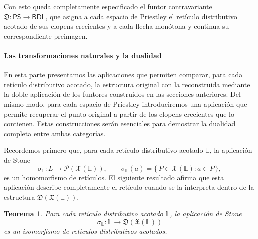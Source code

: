 \documentclass[12pt]{book}
\newtheorem{theorem}{Teorema}[section]
\newcommand{\X}{\mathfrak{X}}
\newcommand{\D}{\mathfrak{D}}
\begin{document}
\smallskip

Con esto queda completamente especificado el funtor contravariante 
\(\D\colon\mathsf{PS}\to\mathsf{BDL}\), que asigna a cada espacio de Priestley el 
retículo distributivo acotado de sus clopens crecientes y a cada flecha 
monótona y continua su correspondiente preimagen.



\paragraph{Las transformaciones naturales y la dualidad}\;

\medskip

En esta parte presentamos las aplicaciones que permiten comparar, para cada retículo distributivo acotado, la estructura original con la reconstruida mediante la doble aplicación de los funtores construidos en las secciones anteriores. Del mismo modo, para cada espacio de Priestley introduciremos una aplicación que permite recuperar el punto original a partir de los clopens crecientes que lo contienen. Estas construcciones serán esenciales para demostrar la dualidad completa entre ambas categorías.

\medskip

Recordemos primero que, para cada retículo distributivo acotado $\mathbb{L}$, la aplicación de Stone
\[
\sigma_{\mathbb{L}}\colon L\longrightarrow \mathcal{P}(\mathcal{X}(\mathbb{L})),
\qquad 
\sigma_{\mathbb{L}}(a)=\{\,P\in\mathcal{X}(\mathbb{L}) : a\in P\,\},
\]
es un homomorfismo de retículos. El siguiente resultado afirma que esta aplicación describe completamente el retículo cuando se la interpreta dentro de la estructura $\D(\X(\mathbb{L}))$.

\begin{theorem}\label{thm:sigma_iso}
Para cada retículo distributivo acotado $\mathbb{L}$,
la aplicación de Stone 
\[
\sigma_{\mathbb{L}}\colon \mathbb{L}\longrightarrow \D(\X(\mathbb{L}))
\]
es un isomorfismo de retículos distributivos acotados.
\end{theorem}
\end{document}

